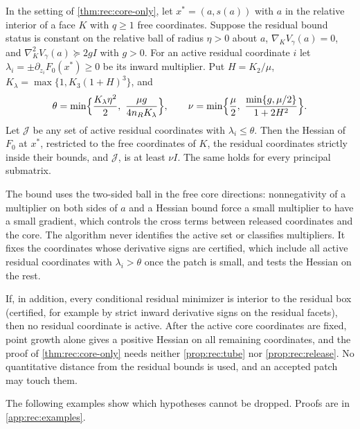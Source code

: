 \begin{proposition}\label{prop:rec:release}
In the setting of \cref{thm:rec:core-only}, let $x^*=(a,s(a))$ with $a$ in
the relative interior of a face $K$ with $q\ge1$ free coordinates. Suppose the
residual bound status is constant on the relative ball of radius $\eta>0$
about $a$, $\nabla_KV_\gamma(a)=0$, and $\nabla_K^2V_\gamma(a)\succeq2gI$
with $g>0$. For an active residual coordinate $i$ let
$\lambda_i=\pm\partial_{z_i}F_0(x^*)\ge0$ be its inward multiplier. Put
$H=K_2/\mu$, $K_\lambda=\max\{1,K_3(1+H)^3\}$, and
\[
 \theta=\min\Bigl\{\frac{K_\lambda\eta^2}2,\ \frac{\mu g}{4n_RK_\lambda}\Bigr\},
 \qquad
 \nu=\min\Bigl\{\frac\mu2,\ \frac{\min\{g,\mu/2\}}{1+2H^2}\Bigr\}.
\]
Let $\mathcal J$ be any set of active residual coordinates with
$\lambda_i\le\theta$. Then the Hessian of $F_0$ at $x^*$, restricted to the
free coordinates of $K$, the residual coordinates strictly inside their
bounds, and $\mathcal J$, is at least $\nu I$. The same holds for every principal submatrix.
\end{proposition}

The bound uses the two-sided ball in the free core directions: nonnegativity
of a multiplier on both sides of $a$ and a Hessian bound force a small
multiplier to have a small gradient, which controls the cross terms between
released coordinates and the core. The algorithm never identifies the
active set or classifies multipliers. It fixes the coordinates whose
derivative signs are certified, which include all active residual
coordinates with $\lambda_i>\theta$ once the patch is small, and tests the
Hessian on the rest.

\begin{remark}\label{rem:rec:interior}
If, in addition, every conditional residual minimizer is interior to the
residual box (certified, for example by strict inward derivative signs on the
residual facets), then no residual coordinate is active. After the active
core coordinates are fixed, point growth alone gives a positive Hessian on
all remaining coordinates, and the proof of \cref{thm:rec:core-only}
needs neither \cref{prop:rec:tube} nor \cref{prop:rec:release}. No
quantitative distance from the residual bounds is used, and an accepted
patch may touch them.
\end{remark}

The following examples show which hypotheses cannot be dropped. Proofs are
in \cref{app:rec:examples}.

